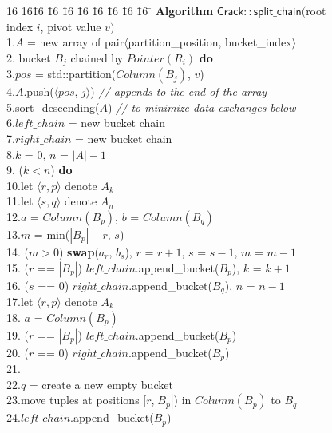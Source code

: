 \begin{figure}[t]
\begin{minipage}{4in}
{\small
\begin{tabbing}
16 16\= 16 \= 16 \= 16 \= 16 \= 16 \= 16 \= 16 \= 16 \= \kill
{\bf Algorithm} $\mathsf{Crack::split\_chain}($root index $i$, pivot value $v)$\\
1.\>$A$ = new array of pair$\langle $partition\_position, bucket\_index$\rangle$\\
2. bucket $B_j$ chained by $Pointer(R_i)$ {\bf do}\\
3.\>\>$pos$ = std::partition($Column(B_j)$, $v$)\\
4.\>\>$A$.push($\langle pos$, $j\rangle$) {\it // appends to the end of the array}\\
5.\>sort\_descending($A$) {\it // to minimize data exchanges below}\\
6.\>$left\_chain$ = new bucket chain\\
7.\>$right\_chain$ = new bucket chain\\
8.\>$k$ = 0, $n$ = $|A|-1$\\
9. ($k < n$) {\bf do}\\
10.\>\>let $\langle r,p\rangle$ denote $A_k$\\
11.\>\>let $\langle s,q\rangle$ denote $A_n$\\
12.\>\>$a$ = $Column(B_p)$, $b$ = $Column(B_q)$\\
13.\>\>$m$ = min($|B_p| - r$, $s$)\\
14.\> ($m>0$) {\bf swap}($a_r$, $b_s$), $r$ = $r+1$, $s$ = $s-1$, $m$ = $m-1$\\
15.\> ($r$ == $|B_p|$) $left\_chain$.append\_bucket($B_{p}$), $k$ = $k+1$\\
16.\> ($s$ == 0) $right\_chain$.append\_bucket($B_{q}$), $n$ = $n-1$\\
17.\>let $\langle r,p\rangle$ denote $A_k$\\
18.\> $a$ = $Column(B_p)$\\
19. ($r$ == $|B_p|$) $left\_chain$.append\_bucket($B_{p}$)\\
20. ($r$ == $0$) $right\_chain$.append\_bucket($B_{p}$)\\
21.\\
22.\>\>$q$ = create a new empty bucket\\
23.\>\>move tuples at positions [$r$,$|B_p|$) in $Column(B_p)$ to $B_q$\\
24.\>\>$left\_chain$.append\_bucket($B_{p}$)\\

\end{tabbing}}
\end{minipage}
\end{figure}
